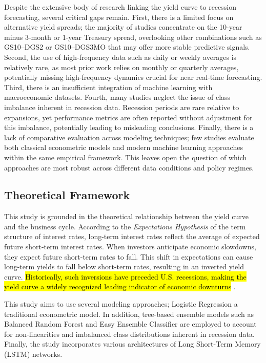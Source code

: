 Despite the extensive body of research linking the yield curve to recession forecasting, several critical gaps remain. First, there is a limited focus on alternative yield spreads; the majority of studies concentrate on the 10-year minus 3-month or 1-year Treasury spread,
overlooking other combinations such as GS10–DGS2 or GS10–DGS3MO that may offer %
more stable predictive signals.
Second, the use of high-frequency data such as daily or weekly averages is relatively
rare, as most prior work relies on monthly or quarterly averages, potentially missing high-frequency dynamics crucial for near real-time forecasting.
Third, there is an insufficient integration of machine learning with macroeconomic datasets. %
Fourth, many studies neglect the issue of class imbalance inherent in recession data. Recession periods are rare relative to expansions, yet performance metrics are often reported without adjustment for this imbalance, potentially leading to misleading conclusions.
Finally, there is a lack of comparative evaluation across modeling techniques; few studies evaluate both classical econometric models and modern machine learning approaches within the same empirical framework. This leaves open the question of which approaches are most robust across different data conditions and policy regimes.


\subsection{Theoretical Framework}
This study is grounded in the theoretical relationship between the yield curve and the business cycle. According to the \textit{Expectations Hypothesis} of the term structure of interest rates, long-term interest rates reflect the average of expected future short-term interest rates. When investors anticipate economic slowdowns, they expect future short-term rates to fall. This shift in expectations can cause long-term yields to fall below short-term rates, resulting in an inverted yield curve. \hl{Historically, such inversions have preceded U.S. recessions, making the yield curve a widely recognized leading indicator of economic downturns} \parencite{estrella1998predicting}.

This study aims to use several modeling approaches; Logistic Regression a traditional econometric model. In addition, tree-based ensemble models such as Balanced Random Forest and Easy Ensemble Classifier are employed to account for non-linearities and imbalanced class distributions inherent in recession data. Finally, the study incorporates various architectures of Long Short-Term Memory (LSTM) networks. 





